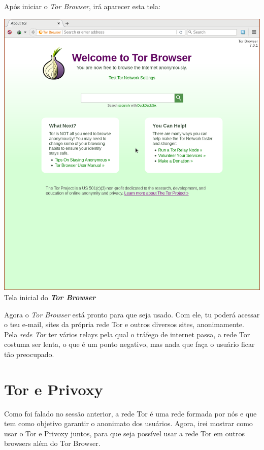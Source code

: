 \documentclass[12pt, letterpaper, DejaVuSansMono:12]{report}
\begin{document}
\pagebreak

	Após iniciar o \textit{Tor Browser}, irá aparecer esta tela:

	\begin{center}
		\includegraphics[scale=0.55]{tbb3.png}\\
		\footnotesize{Tela inicial do \textbf{\textit{Tor Browser}}}
	\end{center}

	Agora o \textit{Tor Browser} está pronto para que seja usado. Com ele, tu poderá acessar o teu e-mail, sites da própria rede Tor e outros diversos sites, anonimamente.\\

	Pela \textit{rede Tor} ter vários relays pela qual o tráfego de internet passa, a rede Tor costuma ser lenta, o que é um ponto negativo, mas nada que faça o usuário ficar tão preocupado.

\pagebreak

\section{Tor e Privoxy}
	Como foi falado no sessão anterior, a rede Tor é uma rede formada por nós e que tem como objetivo garantir o anonimato dos usuários. Agora, irei mostrar como usar o Tor e Privoxy juntos, para que seja possível usar a rede Tor em outros browsers além do Tor Browser.
\end{document}
